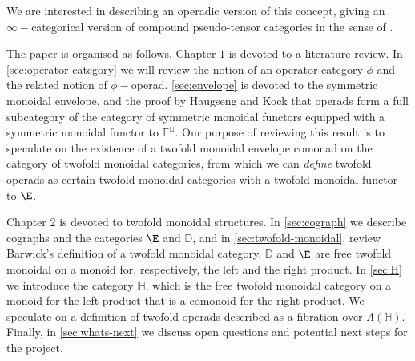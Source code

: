 We are interested in describing an operadic version of this concept, giving an $\infty-$categorical version of compound pseudo-tensor categories in the sense of \cite{BeilinsonDrinfeld}.

The paper is organised as follows. Chapter $1$ is devoted to a literature review. In \cref{sec:operator-category} we will review the notion of an operator category $\phi$ and the related notion of $\phi-$operad. \cref{sec:envelope} is devoted to the symmetric monoidal envelope, and the proof by Haugseng and Kock \cite{HaugsengKock} that operads form a full subcategory of the category of symmetric monoidal functors equipped with a symmetric monoidal functor to $\mathbb{F}^{\sqcup}$. Our purpose of reviewing this result is to speculate on the existence of a twofold monoidal envelope comonad on the category of twofold monoidal categories, from which we can \textit{define} twofold operads as certain twofold monoidal categories with a twofold monoidal functor to $\E$. 


Chapter 2 is devoted to twofold monoidal structures. In \cref{sec:cograph} we describe cographs and the categories $\E$ and $\mathbb{D}$, and in \cref{sec:twofold-monoidal}, review Barwick's definition of a twofold monoidal category. $\mathbb{D}$ and $\E$ are free twofold monoidal on a monoid for, respectively, the left and the right product. In \cref{sec:H} we introduce the category $\mathbb{H}$, which is the free twofold monoidal category on a monoid for the left product that is a comonoid for the right product. We speculate on a definition of twofold operads described as a fibration over $\Lambda(\mathbb{H}).$ Finally, in \cref{sec:whats-next} we discuss open questions and potential next steps for the project.

